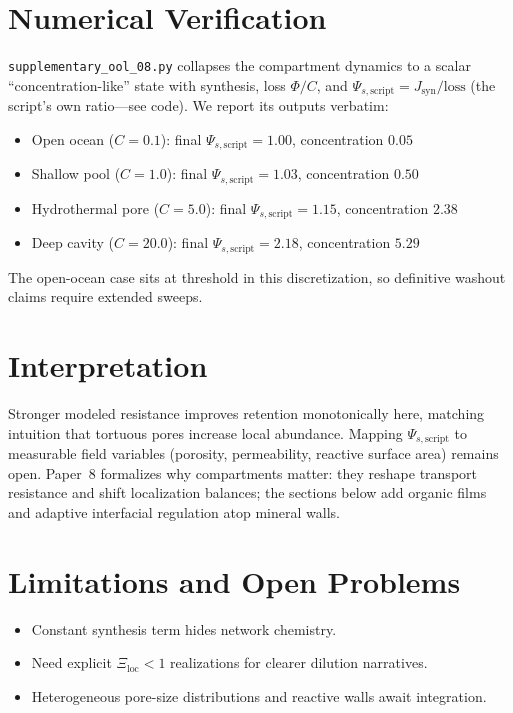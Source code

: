 \documentclass[11pt,a4paper]{article}
\begin{document}
\section{Numerical Verification}
\texttt{supplementary\_ool\_08.py} collapses the compartment dynamics to a scalar ``concentration-like'' state with synthesis, loss $\Phi/C$, and $\Psi_{s,\mathrm{script}} = J_{\mathrm{syn}}/\text{loss}$ (the script's own ratio---see code). We report its outputs verbatim:
\begin{itemize}
\item Open ocean ($C=0.1$): final $\Psi_{s,\mathrm{script}}=1.00$, concentration $0.05$
\item Shallow pool ($C=1.0$): final $\Psi_{s,\mathrm{script}}=1.03$, concentration $0.50$
\item Hydrothermal pore ($C=5.0$): final $\Psi_{s,\mathrm{script}}=1.15$, concentration $2.38$
\item Deep cavity ($C=20.0$): final $\Psi_{s,\mathrm{script}}=2.18$, concentration $5.29$
\end{itemize}
The open-ocean case sits at threshold in this discretization, so definitive washout claims require extended sweeps.

\section{Interpretation}
Stronger modeled resistance improves retention monotonically here, matching intuition that tortuous pores increase local abundance. Mapping $\Psi_{s,\mathrm{script}}$ to measurable field variables (porosity, permeability, reactive surface area) remains open. Paper~8 formalizes why compartments matter: they reshape transport resistance and shift localization balances; the sections below add organic films and adaptive interfacial regulation atop mineral walls.

\section{Limitations and Open Problems}
\begin{itemize}
\item Constant synthesis term hides network chemistry.
\item Need explicit $\Xi_{\mathrm{loc}}<1$ realizations for clearer dilution narratives.
\item Heterogeneous pore-size distributions and reactive walls await integration.
\end{itemize}
\end{document}
